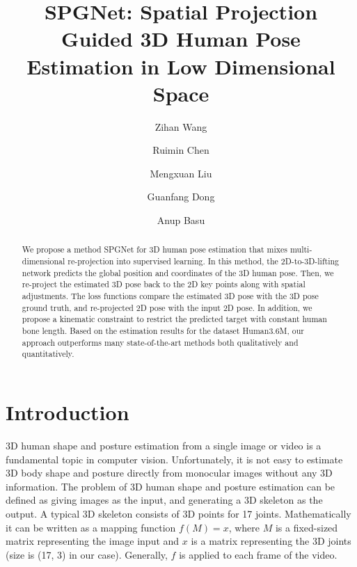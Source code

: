 \documentclass[runningheads]{llncs}
\begin{document}
\title{SPGNet: Spatial Projection Guided 3D Human Pose Estimation in Low Dimensional Space}
\author{Zihan Wang \and
Ruimin Chen  \and
Mengxuan Liu \and
Guanfang Dong  \and
Anup Basu 
}



\maketitle              \begin{abstract}
We propose a method SPGNet for 3D human pose estimation that mixes multi-dimensional re-projection into supervised learning. In this method, the 2D-to-3D-lifting network predicts the global position and coordinates of the 3D human pose. Then, we re-project the estimated 3D pose back to the 2D key points along with spatial adjustments. The loss functions compare the estimated 3D pose with the 3D pose ground truth, and re-projected 2D pose with the input 2D pose. In addition, we propose a kinematic constraint to restrict the predicted target with constant human bone length. Based on the estimation results for the dataset Human3.6M, our approach outperforms many state-of-the-art methods both qualitatively and quantitatively.
 
\end{abstract}


\section{Introduction}
3D human shape and posture estimation from a single image or video is a fundamental topic in computer vision. Unfortunately, it is not easy to estimate 3D body shape and posture directly from monocular images without any 3D information. The problem of 3D human shape and posture estimation can be defined as giving images as the input, and generating a 3D skeleton as the output. A typical 3D skeleton consists of 3D points for 17 joints. Mathematically it can be written as a mapping function \(f(M) = x\), where \(M\) is a fixed-sized matrix representing the image input and \(x\) is a matrix representing the 3D joints (size is (17, 3) in our case). Generally, \(f\) is applied to each frame of the video.
\end{document}
